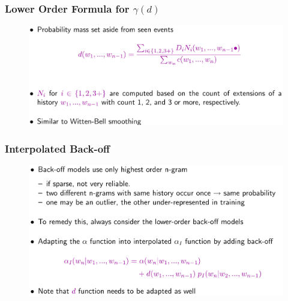 \documentclass{beamer}
\begin{document}
\begin{frame}\frametitle{Lower Order Formula for $\gamma(d)$}
\begin{figure}
\includegraphics[width=1\linewidth]{figure/modified_kneser_ney_high_order.pdf}
\end{figure}
\end{frame}


\begin{frame}\frametitle{Interpolated Back-off}
\begin{figure}
\includegraphics[width=1\linewidth]{figure/interpolated_back_off.pdf}
\end{figure}
\end{frame}
\end{document}
